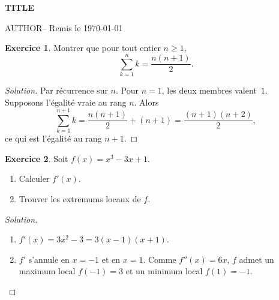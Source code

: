 \documentclass[11pt]{article}
\newcommand{\etudiant}{{{AUTHOR}}}
\theoremstyle{definition}
\newtheorem{exercice}{Exercice}
\newenvironment{solution}{\begin{proof}[Solution]}{\end{proof}}
\begin{document}
\begin{center}
  {\LARGE\bfseries {{TITLE}} \par}
  \medskip
  \etudiant \quad -- \quad Remis le \today
\end{center}

\begin{exercice}
Montrer que pour tout entier $n \ge 1$,
\[
  \sum_{k=1}^{n} k = \frac{n(n+1)}{2}.
\]
\end{exercice}

\begin{solution}
Par récurrence sur $n$. Pour $n = 1$, les deux membres valent~$1$.
Supposons l'égalité vraie au rang $n$. Alors
\[
  \sum_{k=1}^{n+1} k = \frac{n(n+1)}{2} + (n+1) = \frac{(n+1)(n+2)}{2},
\]
ce qui est l'égalité au rang $n+1$.
\end{solution}

\begin{exercice}
Soit $f(x) = x^3 - 3x + 1$.
\begin{enumerate}[label=(\alph*)]
  \item Calculer $f'(x)$.
  \item Trouver les extremums locaux de $f$.
\end{enumerate}
\end{exercice}

\begin{solution}
\begin{enumerate}[label=(\alph*)]
  \item $f'(x) = 3x^2 - 3 = 3(x - 1)(x + 1)$.
  \item $f'$ s'annule en $x = -1$ et en $x = 1$. Comme $f''(x) = 6x$, $f$
        admet un maximum local $f(-1) = 3$ et un minimum local $f(1) = -1$.
\end{enumerate}
\end{solution}
\end{document}
